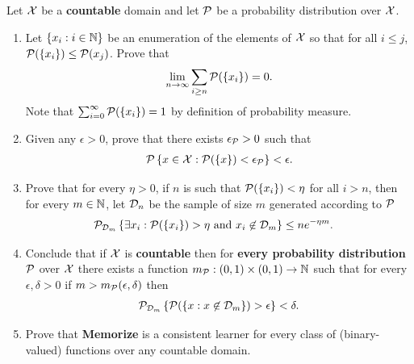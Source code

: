 \documentclass[11pt]{article}
\begin{document}
\begin{itemize}
\begin{exercise}
Let ${\mathcal X}$ be a \textbf{countable} domain and let ${\mathcal P}$ be a probability distribution over ${\mathcal X}$.
\begin{enumerate}
\item Let $\left\{x_i : i \in {\mathbb N}\right\}$ be an enumeration of the elements of ${\mathcal X}$ so that for all $i \le j$, ${\mathcal P}(\left\{x_i\right\}) \le {\mathcal P}({x_j})$. Prove that
\begin{align*}
\lim\limits_{n\rightarrow \infty}\sum_{i \ge n}{\mathcal P}(\left\{x_i\right\}) = 0.
\end{align*} Note that $\sum_{i = 0}^{\infty}{\mathcal P}(\left\{x_i\right\}) = 1$ by definition of probability measure.

\item Given any $\epsilon > 0$, prove that there exists $\epsilon_{{\mathcal P}} > 0$ such that
\begin{align*}
{\mathcal P}\left\{x \in {\mathcal X}: {\mathcal P}(\left\{x\right\}) < \epsilon_{{\mathcal P}}\right\} < \epsilon.
\end{align*}

\item Prove that for every $\eta > 0$, if $n$ is such that ${\mathcal P}(\left\{x_i\right\}) < \eta$ for all $i > n$, then for every $m \in {\mathbb N}$, let ${\mathcal D}_n$ be the sample of  size $m$ generated according to ${\mathcal P}$
\begin{align*}
{\mathcal P}_{{\mathcal D}_{m}}\left\{\exists x_i: {\mathcal P}(\left\{x_i\right\}) > \eta \text{ and }x_i \not\in {\mathcal D}_{m} \right\} &\le n e^{- \eta m}.
\end{align*}

\item Conclude that if ${\mathcal X}$ is \textbf{countable} then for \textbf{every probability distribution} ${\mathcal P}$ over ${\mathcal X}$ there exists a function $m_{{\mathcal P}}: (0,1) \times (0,1) \to {\mathbb N}$ such that for every $\epsilon, \delta > 0$ if $m > m_{{\mathcal P}}(\epsilon, \delta)$ then
\begin{align*}
{\mathcal P}_{{\mathcal D}_{m}}\left\{{\mathcal P}(\left\{x: x\not\in {\mathcal D}_{m}\right\}) > \epsilon \right\} < \delta.
\end{align*}

\item Prove that \textbf{Memorize} is a consistent learner for every class of (binary-valued) functions over any countable domain.
\end{enumerate}
\end{exercise}


\end{itemize}
\end{document}
